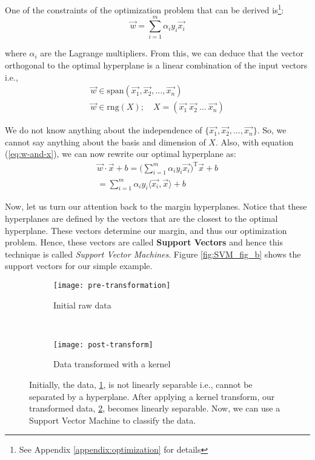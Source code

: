 One of the constraints of the optimization problem that can be derived is\footnote{See Appendix \ref{appendix:optimization} for details}:
\begin{equation}
\vec{w} = \sum_{i = 1}^{m}\alpha_{i}y_{i}\vec{x_i} \label{eq:w-and-x}
\end{equation}

where $\alpha_{i}$ are the Lagrange multipliers. From this, we can deduce that the vector orthogonal to the optimal hyperplane is a linear combination of the input vectors i.e.,
\begin{gather}
	\vec{w} \in \text{span}(\vec{x_1}, \vec{x_2}, \dots, \vec{x_n}) \label{eq:normal-inputs} \\
	\vec{w} \in \text{rng}(X); \quad X = (\vec{x_1} \ \vec{x_2} \ \dots \ \vec{x_n})
\end{gather}

We do not know anything about the independence of $\{\vec{x_1}, \vec{x_2}, \dots, \vec{x_n}\}$. So, we cannot say anything about the basis and dimension of $X$. Also, with equation (\ref{eq:w-and-x}), we can now rewrite our optimal hyperplane as:
\begin{align}
	\vec{w}\cdot\vec{x} + b = \Big(\sum_{i = 1}^{m}\alpha_{i}y_{i}\vec{x_i}\Big)^{\text{T}}\vec{x} + b \nonumber \\
= \sum_{i = 1}^{m}\alpha_{i}y_{i}\langle\vec{x_i}, \vec{x}\rangle + b \label{eq:new-plane}
\end{align}

Now, let us turn our attention back to the margin hyperplanes. Notice that these hyperplanes are defined by the vectors that are the closest to the optimal hyperplane. These vectors determine our margin, and thus our optimization problem. Hence, these vectors are called \textbf{Support Vectors} and hence this technique is called \textit{Support Vector Machines}. Figure \ref{fig:SVM_fig_b} shows the support vectors for our simple example.

\begin{figure*}[!tb]
	\centering
	\begin{subfigure}[t]{0.5\textwidth}
		\texttt{[image: pre-transformation]}
		\caption{Initial raw data}
		\centering
		\label{fig:pre-trans}
	\end{subfigure}%
	~
	\begin{subfigure}[t]{0.5\textwidth}
		\texttt{[image: post-transform]}
		\caption{Data transformed with a kernel}
		\centering
		\label{fig:post-trans}
	\end{subfigure}%
	
	\caption{Initially, the data, \ref{fig:pre-trans}, is not linearly separable i.e., cannot be separated by a hyperplane. After applying a kernel transform, our transformed data, \ref{fig:post-trans}, becomes linearly separable. Now, we can use a Support Vector Machine to classify the data.}	
	\label{fig:kernel}
\end{figure*}

